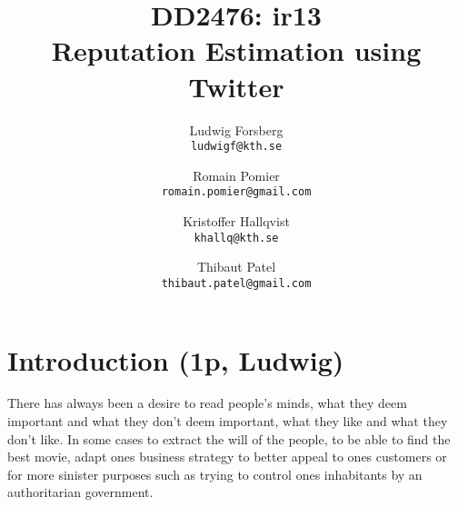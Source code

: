 \documentclass[landscape,letterpaper,12pt]{article}
\title{\TitleFontTwo DD2476: ir13 \\ \TitleFont Reputation Estimation using Twitter}
\author{Ludwig Forsberg \\ \texttt{ludwigf@kth.se} \and Romain Pomier \\ \texttt{romain.pomier@gmail.com} \and Kristoffer Hallqvist \\ \texttt{khallq@kth.se} \and Thibaut Patel \\ \texttt{thibaut.patel@gmail.com}}
\begin{document}
\thefontsize\Huge

\maketitle

\clearpage
\chapter{Introduction (1p, Ludwig)}

There has always been a desire to read people's minds, what they deem important and what they don't deem important, what they like and what they don't like. 
In some cases to extract the will of the people, to be able to find the best movie, adapt ones business strategy to better appeal to ones customers or for more sinister purposes such as trying to control ones inhabitants by an authoritarian government.
\end{document}
